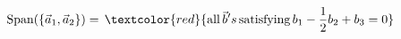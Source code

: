 \documentclass[preview]{standalone}
\begin{document}
\begin{align*}
\text{Span}(\{\vec{a}_1, \vec{a}_2\}) = \, \textcolor{red}{\text{all} \, \vec{b}'s \, \text{satisfying} \, b_1 - \frac{1}{2}b_2 + b_3 = 0}
\end{align*}
\end{document}
